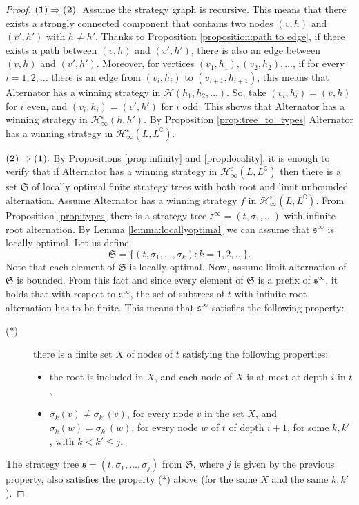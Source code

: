\begin{proof}
${\bf (1) \Rightarrow (2).}$  Assume the strategy graph is recursive. This means that there exists a strongly connected component that contains two nodes $(v, h)$ and $(v', h')$ with $h \neq h'$. 
Thanks to Proposition \ref{proposition:path to edge}, if there exists a path between $(v, h)$ and $(v', h')$, there is also an edge between $(v, h)$ and $(v', h')$. 
Moreover, for vertices $(v_1,h_1),(v_2,h_2),\dots$, if for every $i=1,2,\dots$ there is an edge from $(v_i, h_i)$ to $(v_{i+1}, h_{i+1})$, this means that Alternator has a winning strategy in $\mathcal{H}(h_1,h_2,\dots)$. So, take $(v_i, h_i)= (v,h)$ for $i$ even, and $(v_i, h_i)= (v',h')$ for $i$ odd. This shows that Alternator has a winning strategy in $\mathcal{H}^\varepsilon_\infty(h, h')$. By Proposition \ref{prop:tree_to_types}
Alternator has a winning strategy in  $\mathcal{H}^\varepsilon_\infty(L, L^\complement)$.


${\bf (2) \Rightarrow (1).}$ 
By Propositions \ref{prop:infinity}  and \ref{prop:locality}, it is enough to verify that 
 if Alternator has a winning strategy in $\mathcal{H}^\varepsilon_\infty(L, L^\complement)$ then there is a set $\mathfrak{S}$ of locally optimal finite strategy trees  with both root and limit unbounded alternation. 
Assume Alternator has a winning strategy $f$ in  $\mathcal{H}^\varepsilon_\infty(L, L^\complement)$. From Proposition \ref{prop:types} there is a strategy tree $\mathfrak{s}^\infty = (t,\sigma_1,\dots) $ with infinite root alternation. 
 By Lemma \ref{lemma:locallyoptimal} we can assume that $\mathfrak{s}^\infty$ is  locally optimal. Let us define 
\[ \mathfrak{S}= \{ (t,\sigma_1,\dots,\sigma_k): k=1,2,\dots\}. \]
Note that each element of $\mathfrak{S}$ is locally optimal.
Now, assume limit alternation of $\mathfrak{S}$ is bounded.
From this fact and since every element of $\mathfrak{S}$ is a prefix of $\mathfrak{s}^\infty$, it holds that with respect to $\mathfrak{s}^\infty$, the set of subtrees of $t$ with infinite root alternation has to be finite. This means that $\mathfrak{s}^\infty$ satisfies the following property:
\begin{description}
\item[(*)] 
there is a finite set $X$ of nodes of $t$ satisfying the following properties:
\begin{itemize}
\item the root is included in $X$, and each node of $X$ is at most at depth $i$ in $t$, 
\item $\sigma_k(v)\neq \sigma_{k'}(v)$, for every node $v$ in the set $X$, and $\sigma_k(w)= \sigma_{k'}(w)$, for every node $w$ of $t$ of depth $i+1$, for some $k, k'$ , with $k < k' \leq j$.
\end{itemize}
\end{description}
The strategy tree $\mathfrak{s}=(t, \sigma_1, \dots, \sigma_j)$ from $\mathfrak{S}$, where $j$ is given by the previous property, also satisfies the property (*) above (for the same $X$ and the same $k, k'$).


\end{proof}

